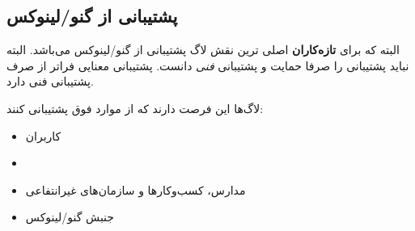 
\subsection{پشتیبانی از گنو/لینوکس }

البته که برای
{\bfseries تازه‌کاران}
اصلی ترین نقش لاگ پشتیبانی از گنو/لینوکس می‌باشد.
البته نباید پشتیبانی را صرفا حمایت و پشتیبانی
{\itshape فنی}
دانست. پشتیبانی معنایی فراتر از صرف پشتیبانی فنی دارد.

لاگ‌ها این فرصت دارند که از موارد فوق پشتیبانی کنند:

\begin{itemize}
\item
کاربران
\item {}
\item
مدارس، کسب‌وکارها و سازمان‌های غیرانتفاعی
\item
جنبش گنو/لینوکس
\end{itemize}

